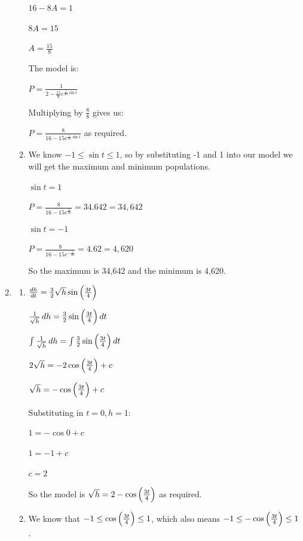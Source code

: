 \documentclass[../main.tex]{subfiles}
\begin{document}
\begin{spacing}{1.5}
\begin{enumerate}[itemsep=0.7cm]
\begin{enumerate}[itemsep=0.5cm]
        $16-8A=1$

        $8A=15$

        $A=\frac{15}{8}$

        The model is:

        $P=\frac{1}{2-\frac{15}{8}e^{\frac{1}{20}\sin{t}}}$

        Multiplying by $\frac{8}{8}$ gives us:

        $P=\frac{8}{16-15e^{\frac{1}{20}\sin{t}}}$ as required.

        \item
        We know $-1\leq \sin{t} \leq 1$, so by substituting -1 and 1 into our model we will get the maximum and minimum populations.

        $\sin{t}=1$

        $P=\frac{8}{16-15e^{\frac{1}{20}}}=34.642 = 34,642$

        $\sin{t}=-1$

        $P=\frac{8}{16-15e^{-\frac{1}{20}}}=4.62 = 4,620$

        So the maximum is 34,642 and the minimum is 4,620.

        
    \end{enumerate}

    \item 
    \begin{enumerate}[itemsep=0.5cm]
        \item 
        $\frac{dh}{dt}=\frac{3}{2}\sqrt{h}\sin{\Bigl(\frac{3t}{4}\Bigr)}$

        $\frac{1}{\sqrt{h}}\,dh=\frac{3}{2}\sin{\Bigl(\frac{3t}{4}\Bigr)}\,dt$

        $\int \frac{1}{\sqrt{h}}\,dh=\int \frac{3}{2}\sin{\Bigl(\frac{3t}{4}\Bigr)}\,dt$

        $2\sqrt{h}=-2\cos{\Bigl(\frac{3t}{4}\Bigr)}+c$

        $\sqrt{h}=-\cos{\Bigl(\frac{3t}{4}\Bigr)}+c$

        Substituting in $t=0, h=1$:

        $1=-\cos{0}+c$

        $1=-1+c$

        $c=2$

        So the model is $\sqrt{h}=2-\cos{\Bigl(\frac{3t}{4}\Bigr)}$ as required.

        \item 
        We know that $-1 \leq \cos{\Bigl(\frac{3t}{4}\Bigr)}\leq 1$, which also means $-1 \leq -\cos{\Bigl(\frac{3t}{4}\Bigr)}\leq 1$.


\end{enumerate}
\end{enumerate}
\end{spacing}
\end{document}
